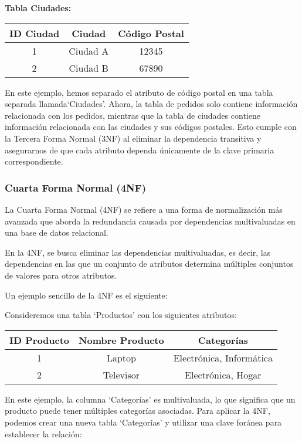 \documentclass[executivepaper]{article}
\begin{document}
\textbf{Tabla Ciudades:}
\begin{center}
\begin{tabular}{|c|c|c|}
\hline
\textbf{ID Ciudad} & \textbf{Ciudad} & \textbf{Código Postal} \\
\hline
1 & Ciudad A & 12345 \\
\hline
2 & Ciudad B & 67890 \\
\hline
\end{tabular}
\end{center}

En este ejemplo, hemos separado el atributo de código postal en una tabla separada llamada\enquote*{Ciudades}. Ahora, la tabla de pedidos solo contiene información relacionada con los pedidos, mientras que la tabla de ciudades contiene información relacionada con las ciudades y sus códigos postales. Esto cumple con la Tercera Forma Normal (3NF) al eliminar la dependencia transitiva y asegurarnos de que cada atributo dependa únicamente de la clave primaria correspondiente.

\subsubsection*{Cuarta Forma Normal (4NF)}

La Cuarta Forma Normal (4NF) se refiere a una forma de normalización más avanzada que aborda la redundancia causada por dependencias multivaluadas en una base de datos relacional.

En la 4NF, se busca eliminar las dependencias multivaluadas, es decir, las dependencias en las que un conjunto de atributos determina múltiples conjuntos de valores para otros atributos.

Un ejemplo sencillo de la 4NF es el siguiente:

Consideremos una tabla \enquote*{Productos} con los siguientes atributos:

\begin{center}
\begin{tabular}{|c|c|c|}
\hline
\textbf{ID Producto} & \textbf{Nombre Producto} & \textbf{Categorías} \\
\hline
1 & Laptop & Electrónica, Informática \\
\hline
2 & Televisor & Electrónica, Hogar \\
\hline
\end{tabular}
\end{center}

En este ejemplo, la columna \enquote*{Categorías} es multivaluada, lo que significa que un producto puede tener múltiples categorías asociadas. Para aplicar la 4NF, podemos crear una nueva tabla \enquote*{Categorías} y utilizar una clave foránea para establecer la relación:
\end{document}
